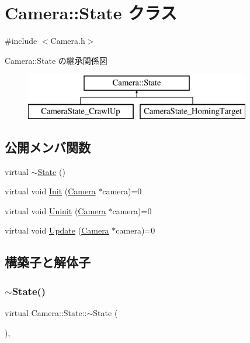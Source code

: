 \hypertarget{class_camera_1_1_state}{}\section{Camera\+:\+:State クラス}
\label{class_camera_1_1_state}


{\ttfamily \#include $<$Camera.\+h$>$}

Camera\+:\+:State の継承関係図\begin{figure}[H]
\begin{center}
\leavevmode
\includegraphics[height=2.000000cm]{class_camera_1_1_state}
\end{center}
\end{figure}
\subsection*{公開メンバ関数}
\begin{DoxyCompactItemize}
\item 
virtual \mbox{\hyperlink{class_camera_1_1_state_a61b74bb711d49e26c0f07af65fb74eb9}{$\sim$\+State}} ()
\item 
virtual void \mbox{\hyperlink{class_camera_1_1_state_aa1b81471ab15e64b3117ffe7de9560ff}{Init}} (\mbox{\hyperlink{class_camera}{Camera}} $\ast$camera)=0
\item 
virtual void \mbox{\hyperlink{class_camera_1_1_state_a68ebfc3f15cae24b342cb5dae57497cf}{Uninit}} (\mbox{\hyperlink{class_camera}{Camera}} $\ast$camera)=0
\item 
virtual void \mbox{\hyperlink{class_camera_1_1_state_a2d41e0cb783666bae6c6ea167fcc7874}{Update}} (\mbox{\hyperlink{class_camera}{Camera}} $\ast$camera)=0
\end{DoxyCompactItemize}


\subsection{構築子と解体子}
\mbox{\label{class_camera_1_1_state_a61b74bb711d49e26c0f07af65fb74eb9}} 
\subsubsection{\texorpdfstring{$\sim$\+State()}{~State()}}
{\footnotesize\ttfamily virtual Camera\+::\+State\+::$\sim$\+State (\begin{DoxyParamCaption}{ }\end{DoxyParamCaption})\hspace{0.3cm}{\ttfamily [inline]}, {\ttfamily [virtual]}}



